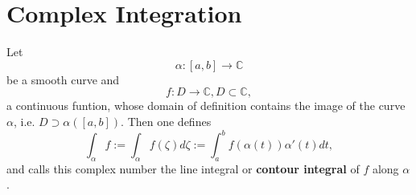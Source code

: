 \section{Complex Integration}

\begin{definition}
    \label{sec:Alice}
    Let
    $$\alpha : [a, b] \rightarrow \mathbb{C}$$
    be a smooth curve and
    $$f: D \rightarrow \mathbb{C}, D \subset \mathbb{C},$$
    a continuous funtion, whose domain of definition contains the image of the curve $\alpha$,
    i.e. $D \supset \alpha([a,b]).$ Then one defines
    $$ \int_\alpha f:= \int_\alpha f(\zeta) d\zeta := \int_a^b f(\alpha(t))\alpha'(t)dt,$$
    and calls this complex number the line integral or \textbf{contour integral} of $f$ along $\alpha$.
\end{definition}

%
%
%
%
%
%
%
